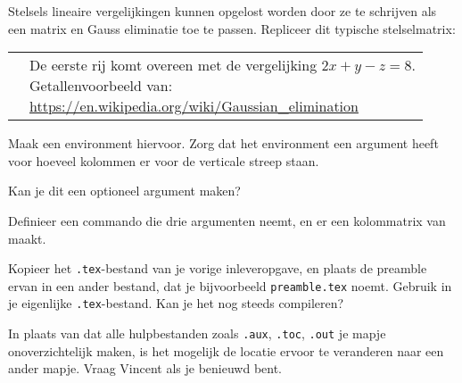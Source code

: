 \documentclass[a4paper]{article}
\begin{document}
\begin{exercise}
Stelsels lineaire vergelijkingen kunnen opgelost worden door ze te schrijven als een matrix en Gauss
eliminatie toe te passen.
Repliceer dit typische stelselmatrix:

\begin{tabularx}{\textwidth}{Xp{}}
\adjustbox{valign=t}{\small$\displaystyle
    \left(\begin{array}{rrr|r}
        2 & 1 & -1 & 8\\
        -3 & -1 & 2 & -11\\
        -2 & 1 & 2 & -3
    \end{array}\right)
$}&
\parbox[t]{0.65\textwidth}{\small De eerste rij komt overeen met de vergelijking $ 2x+y-z=8 $.\\
Getallenvoorbeeld van:\\\url{https://en.wikipedia.org/wiki/Gaussian_elimination}}
\end{tabularx}

Maak een environment hiervoor. Zorg dat het environment een argument heeft voor hoeveel
kolommen er voor de verticale streep staan.

Kan je dit een optioneel argument maken?
\end{exercise}

\begin{exercise}[Vector]
    Definieer een commando die drie argumenten neemt, en er een kolommatrix van maakt.
\end{exercise}

\begin{exercise}
    Kopieer het \texttt{.tex}-bestand van je vorige inleveropgave, en plaats de preamble ervan
    in een ander bestand, dat je bijvoorbeeld \texttt{preamble.tex} noemt. Gebruik
    \texttt{} in je eigenlijke \texttt{.tex}-bestand.
    Kan je het nog steeds compileren?
\end{exercise}


\begin{exercise}
    In plaats van dat alle hulpbestanden zoals \texttt{.aux}, \texttt{.toc}, \texttt{.out}
    je mapje onoverzichtelijk maken, is het mogelijk de locatie ervoor te veranderen naar een
    ander mapje. Vraag Vincent als je benieuwd bent.
\end{exercise}
\end{document}
